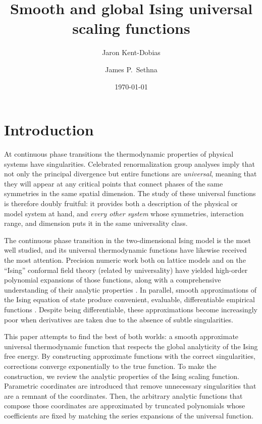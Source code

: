 \documentclass[
aps,
pre,
preprint,
longbibliography,
floatfix
]{revtex4-2}
\begin{document}
\title{Smooth and global Ising universal scaling functions}

\author{Jaron Kent-Dobias}

\author{James P.~Sethna}

\date\today

\begin{abstract}
\end{abstract}

\maketitle

\section{Introduction}

At continuous phase transitions the thermodynamic properties of physical
systems have singularities. Celebrated renormalization group analyses imply
that not only the principal divergence but entire functions are
\emph{universal}, meaning that they will appear at any critical points that
connect phases of the same symmetries in the same spatial dimension. The study
of these universal functions is therefore doubly fruitful: it provides both a
description of the physical or model system at hand, and \emph{every other
system} whose symmetries, interaction range, and dimension puts it in the same
universality class.

The continuous phase transition in the two-dimensional Ising model is the most
well studied, and its universal thermodynamic functions have likewise received
the most attention. Precision numeric work both on lattice models and on the
``Ising'' conformal field theory (related by universality) have yielded
high-order polynomial expansions of those functions, along with a comprehensive
understanding of their analytic properties \cite{Fonseca_2003_Ising,
Mangazeev_2008_Variational, Mangazeev_2010_Scaling}.  In parallel, smooth
approximations of the Ising equation of state produce convenient, evaluable,
differentiable empirical functions \cite{Caselle_2001_The}. Despite being
differentiable, these approximations become increasingly poor when derivatives
are taken due to the absence of subtle singularities.

This paper attempts to find the best of both worlds: a smooth approximate
universal thermodynamic function that respects the global analyticity of the
Ising free energy. By constructing approximate functions with the correct
singularities, corrections converge exponentially to the true function. To make
the construction, we review the analytic properties of the Ising scaling
function. Parametric coordinates are introduced that remove unnecessary
singularities that are a remnant of the coordinates. Then, the arbitrary
analytic functions that compose those coordinates are approximated by truncated
polynomials whose coefficients are fixed by matching the series expansions of
the universal function.
\end{document}
